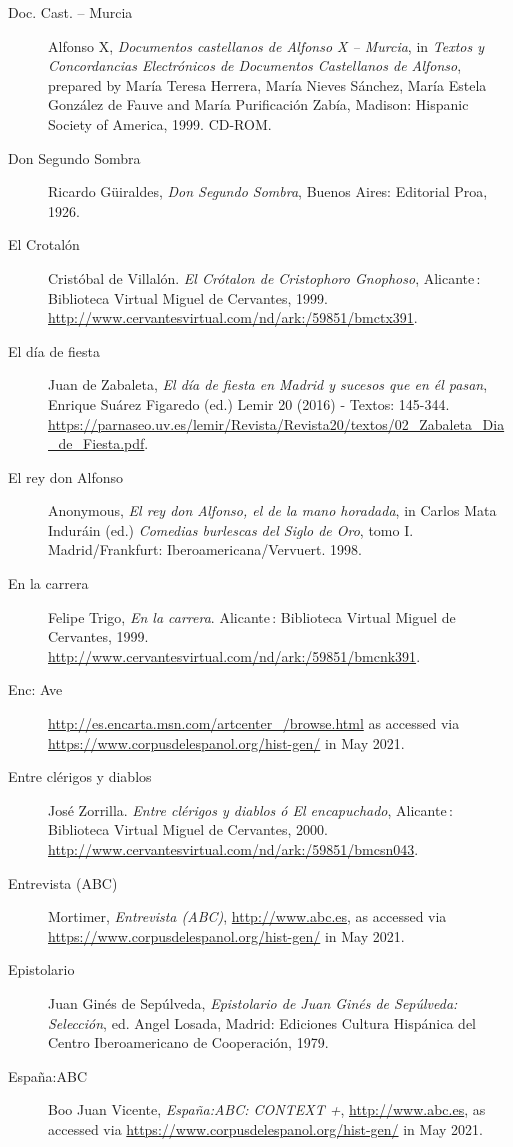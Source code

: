 \begin{flushleft}
\begin{description}
\item[Doc. Cast. – Murcia]Alfonso X, \textit{Documentos castellanos de Alfonso X – Murcia}, in \textit{Textos y Concordancias Electrónicos de Documentos Castellanos de Alfonso}, prepared by María Teresa Herrera, María Nieves Sánchez, María Estela González de Fauve and María Purificación Zabía, Madison: Hispanic Society of America, 1999. CD-ROM.
\item[Don Segundo Sombra]Ricardo Güiraldes, \textit{Don Segundo Sombra}, Buenos Aires: Editorial Proa, 1926.
\item[El Crotalón]Cristóbal de Villalón. \textit{El Crótalon de Cristophoro Gnophoso}, Alicante : Biblioteca Virtual Miguel de Cervantes, 1999. \url{http://www.cervantesvirtual.com/nd/ark:/59851/bmctx391}.
\item[El día de fiesta]Juan de Zabaleta, \textit{El día de fiesta en Madrid y sucesos que en él pasan}, Enrique Suárez Figaredo (ed.) Lemir 20 (2016) - Textos: 145-344. \url{https://parnaseo.uv.es/lemir/Revista/Revista20/textos/02_Zabaleta_Dia_de_Fiesta.pdf}.
\item[El rey don Alfonso]Anonymous, \textit{El rey don Alfonso, el de la mano horadada}, in Carlos Mata Induráin (ed.) \textit{Comedias burlescas del Siglo de Oro}, tomo I. Madrid/Frankfurt: Iberoamericana/Vervuert. 1998.
\item[En la carrera]Felipe Trigo, \textit{En la carrera}. Alicante : Biblioteca Virtual Miguel de Cervantes, 1999. \url{http://www.cervantesvirtual.com/nd/ark:/59851/bmcnk391}.
\item[Enc: Ave]\url{http://es.encarta.msn.com/artcenter_/browse.html} as accessed via \url{https://www.corpusdelespanol.org/hist-gen/} in May 2021.
\item[Entre clérigos y diablos]José Zorrilla. \textit{Entre clérigos y diablos ó El encapuchado}, Alicante : Biblioteca Virtual Miguel de Cervantes, 2000. \url{http://www.cervantesvirtual.com/nd/ark:/59851/bmcsn043}.
\item[Entrevista (ABC)]Mortimer, \textit{Entrevista (ABC)}, \url{http://www.abc.es}, as accessed via \url{https://www.corpusdelespanol.org/hist-gen/} in May 2021.
\item[Epistolario]Juan Ginés de Sepúlveda, \textit{Epistolario de Juan Ginés de Sepúlveda: Selección}, ed. Angel Losada, Madrid: Ediciones Cultura Hispánica del Centro Iberoamericano de Cooperación, 1979.
\item[España:ABC]Boo Juan Vicente, \textit{España:ABC: CONTEXT +}, \url{http://www.abc.es}, as accessed via \url{https://www.corpusdelespanol.org/hist-gen/} in May 2021.

\end{description}
\end{flushleft}

